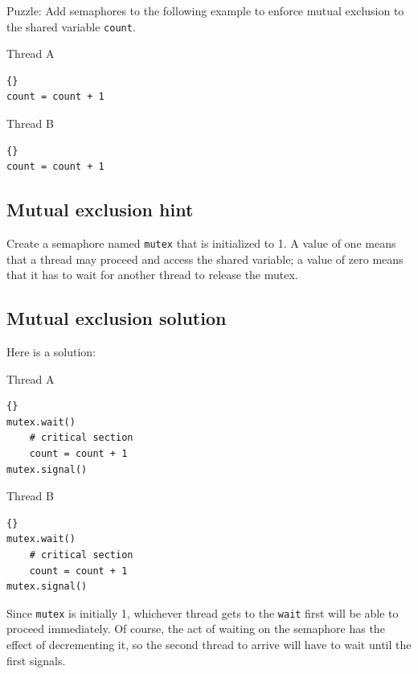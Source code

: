 \documentclass{book}
\newcommand{\clearemptydoublepage}{\newpage\cleardoublepage}
\begin{document}
Puzzle: Add semaphores to the following example to
enforce mutual exclusion to the shared variable {\tt count}.

\begin{minipage}[t]{2in}
Thread A
\begin{lstlisting}[labelstep=0, indent=10pt]{}
count = count + 1
\end{lstlisting}
\end{minipage}
\hfill
\begin{minipage}[t]{2in}
Thread B
\begin{lstlisting}[labelstep=0, indent=10pt]{}
count = count + 1
\end{lstlisting}
\end{minipage}


\clearemptydoublepage
\subsection{Mutual exclusion hint}

Create a semaphore named {\tt mutex} that is initialized
to 1.  A value of one means that a thread may proceed and
access the shared variable; a value of zero means that it
has to wait for another thread to release the mutex.


\clearemptydoublepage
\subsection{Mutual exclusion solution}

Here is a solution:

\begin{minipage}[t]{2in}
Thread A
\begin{lstlisting}[labelstep=0, indent=10pt]{}
mutex.wait()
    # critical section
    count = count + 1
mutex.signal()
\end{lstlisting}
\end{minipage}
\hfill
\begin{minipage}[t]{2in}
Thread B
\begin{lstlisting}[labelstep=0, indent=10pt]{}
mutex.wait()
    # critical section
    count = count + 1
mutex.signal()
\end{lstlisting}
\end{minipage}

Since {\tt mutex} is initially 1, whichever thread gets to
the {\tt wait} first will be able to proceed immediately.
Of course, the act of waiting on the semaphore has the effect
of decrementing it, so the second thread to
arrive will have to wait until the first signals.
\end{document}

